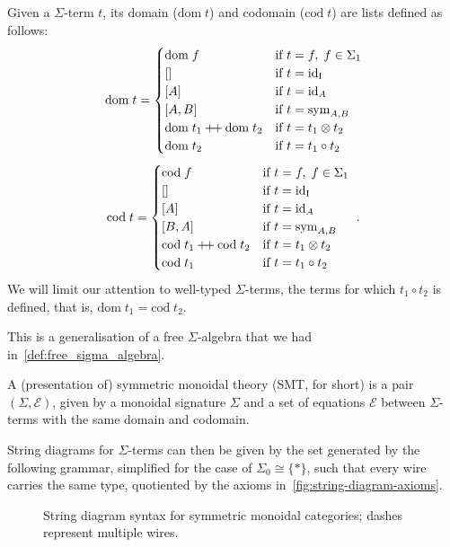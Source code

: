 \begin{definition}
  Given a $\Sigma$-term $t$, its domain ($\mathrm{dom}\;t$) and codomain ($\mathrm{cod}\;t$) are lists defined as follows:
  \[
  \mathrm{dom}\;t = \begin{cases}
    \mathrm{dom}\;f & \text{if } t = f,\;f \in \Sigma_{1}\\
    [] & \text{if } t = \operatorname{id}_{\operatorname{I}}\\
    [A] & \text{if } t = \operatorname{id}_A \\
    [A,B] & \text{if } t = \operatorname{sym}_{A,B} \\
    \mathrm{dom}\;t_1 \mathbin{+\!+} \mathrm{dom}\;t_2 & \text{if } t = t_1 \otimes t_2\\
    \mathrm{dom}\;t_2 & \text{if } t = t_1 \circ t_2
  \end{cases}
  \]
  \[
  \mathrm{cod}\;t = \begin{cases}
    \mathrm{cod}\;f & \text{if } t = f,\;f \in \Sigma_{1}\\
    [] & \text{if } t = \operatorname{id}_{\operatorname{I}}\\
    [A] & \text{if } t = \operatorname{id}_A \\
    [B,A] & \text{if } t = \operatorname{sym}_{A,B} \\
    \mathrm{cod}\;t_1 \mathbin{+\!+} \mathrm{cod}\;t_2 & \text{if } t = t_1 \otimes t_2\\
    \mathrm{cod}\;t_1 & \text{if } t = t_1 \circ t_2
  \end{cases}~.
  \]
  We will limit our attention to well-typed $\Sigma$-terms, the terms for which $t_1 \circ t_2$ is defined, that is, $\mathrm{dom}\;t_1 = \mathrm{cod}\;t_2$.
\end{definition}
This is a generalisation of a free $\Sigma$-algebra that we had in~\cref{def:free_sigma_algebra}.
\begin{definition}
  A (presentation of) symmetric monoidal theory (SMT, for short) is a pair $(\Sigma, \mathcal{E})$, given by a monoidal signature $\Sigma$ and a set of equations $\mathcal{E}$ between $\Sigma$-terms with the same domain and codomain.
\end{definition}

String diagrams for $\Sigma$-terms can then be given by the set generated by the following grammar, simplified for the case of $\Sigma_0 \cong \{*\}$, such that every wire carries the same type, quotiented by the axioms in~\cref{fig:string-diagram-axioms}.
\begin{figure}[h!]
    \centering
    \caption{String diagram syntax for symmetric monoidal categories; dashes represent multiple wires.}
    \label{fig:string-diagram-syntax-2}
\end{figure}

